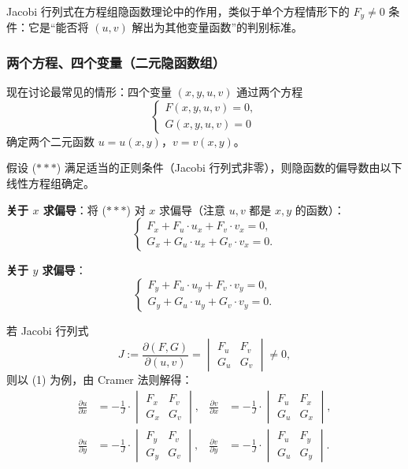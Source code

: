\documentclass[lang=cn,11pt]{elegantbook}
\begin{document}
Jacobi 行列式在方程组隐函数理论中的作用，类似于单个方程情形下的 $F_y \neq 0$ 条件：它是“能否将 $(u,v)$ 解出为其他变量函数”的判别标准。

\subsubsection*{两个方程、四个变量（二元隐函数组）}

现在讨论最常见的情形：四个变量 $(x,y,u,v)$ 通过两个方程
\[
\begin{cases}
F(x,y,u,v)=0,\\[2pt]
G(x,y,u,v)=0
\end{cases}
\tag{$\ast\ast\ast$}
\]
确定两个二元函数 $u=u(x,y)$，$v=v(x,y)$。

\begin{property} \label{prop:jacobi-system}
假设 ($\ast\ast\ast$) 满足适当的正则条件（Jacobi 行列式非零），则隐函数的偏导数由以下线性方程组确定。

\textbf{关于 $x$ 求偏导}：将 ($\ast\ast\ast$) 对 $x$ 求偏导（注意 $u,v$ 都是 $x,y$ 的函数）：
\[
\begin{cases}
F_x+F_u\cdot u_x+F_v\cdot v_x=0,\\[6pt]
G_x+G_u\cdot u_x+G_v\cdot v_x=0.
\end{cases}
\tag{1}
\]

\textbf{关于 $y$ 求偏导}：
\[
\begin{cases}
F_y+F_u\cdot u_y+F_v\cdot v_y=0,\\[6pt]
G_y+G_u\cdot u_y+G_v\cdot v_y=0.
\end{cases}
\tag{2}
\]

若 Jacobi 行列式
\[
J:=\frac{\partial(F,G)}{\partial(u,v)}
  =\begin{vmatrix}
    F_u & F_v\\
    G_u & G_v
  \end{vmatrix}
\neq 0,
\]
则以 (1) 为例，由 Cramer 法则解得：
\[
\boxed{
\begin{aligned}
\frac{\partial u}{\partial x}&=-\frac{1}{J}\cdot
  \begin{vmatrix}
    F_x & F_v\\
    G_x & G_v
  \end{vmatrix},
&
\frac{\partial v}{\partial x}&=-\frac{1}{J}\cdot
  \begin{vmatrix}
    F_u & F_x\\
    G_u & G_x
  \end{vmatrix},\\[10pt]
\frac{\partial u}{\partial y}&=-\frac{1}{J}\cdot
  \begin{vmatrix}
    F_y & F_v\\
    G_y & G_v
  \end{vmatrix},
&
\frac{\partial v}{\partial y}&=-\frac{1}{J}\cdot
  \begin{vmatrix}
    F_u & F_y\\
    G_u & G_y
  \end{vmatrix}.
\end{aligned}}
\]
\end{property}
\end{document}
